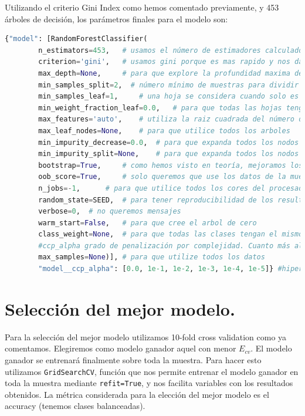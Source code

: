 \documentclass[11pt,a4paper]{article}
\theoremstyle{definition}
\begin{document}
		Utilizando el criterio Gini Index como hemos comentado previamente, y 453 árboles de decisión, los parámetros finales para el modelo son:
		
			\begin{lstlisting}[language=Python, caption= Par\'ametros usados en RandomForestClassifier, inputencoding=latin1]
  {"model": [RandomForestClassifier(
        n_estimators=453,   # usamos el número de estimadores calculados
        criterion='gini',   # usamos gini porque es mas rapido y nos da resultados similares
        max_depth=None,     # para que explore la profundidad maxima del arbol
        min_samples_split=2,  # número mínimo de muestras para dividir un nodo, con 2 divide siempre que no sean hojas
        min_samples_leaf=1,     # una hoja se considera cuando solo es una muestra
        min_weight_fraction_leaf=0.0,   # para que todas las hojas tenga el mismo peso
        max_features='auto',    # utiliza la raiz cuadrada del número de características
        max_leaf_nodes=None,    # para que utilice todos los arboles
        min_impurity_decrease=0.0,  # para que expanda todos los nodos
        min_impurity_split=None,    # para que expanda todos los nodos
        bootstrap=True,     # como hemos visto en teoría, mejoramos los resultados usando bootstrap
        oob_score=True,     # solo queremos que use los datos de la muestra
        n_jobs=-1,      # para que utilice todos los cores del procesador
        random_state=SEED,  # para tener reproducibilidad de los resultados
        verbose=0,  # no queremos mensajes
        warm_start=False,   # para que cree el arbol de cero
        class_weight=None,  # para que todas las clases tengan el mismo peso
        #ccp_alpha grado de penalización por complejidad. Cuanto más alto más podado. Parámetro para regularizar y evitar sobreajuste. Será hiperparámetro a estimar
        max_samples=None)], # para que utilize todos los datos
        "model__ccp_alpha": [0.0, 1e-1, 1e-2, 1e-3, 1e-4, 1e-5]} #hiperparámetro a estimar

	\end{lstlisting}
	
	
	\section{Selección del mejor modelo.}
	Para la selección del mejor modelo utilizamos 10-fold cross validation como ya comentamos. Elegiremos como modelo ganador aquel con menor $E_{cv}$. El modelo ganador se entrenará finalmente sobre toda la muestra. Para hacer esto utilizamos \texttt{GridSearchCV}, función que nos permite entrenar el modelo ganador en toda la muestra mediante \texttt{refit=True}, y nos facilita variables con los resultados obtenidos. La métrica considerada para la elección del mejor modelo es el accuracy (tenemos clases balanceadas).
	
\end{document}
